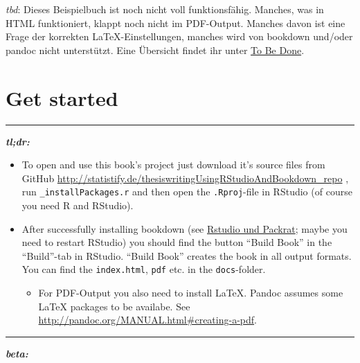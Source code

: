 \documentclass[]{book}
\providecommand{\tightlist}{%
  \setlength{\itemsep}{0pt}\setlength{\parskip}{0pt}}
\theoremstyle{definition}
\theoremstyle{definition}
\theoremstyle{remark}
\let\BeginKnitrBlock\begin \let\EndKnitrBlock\end
\begin{document}
\BeginKnitrBlock{rmdcaution}
\emph{tbd}: Dieses Beispielbuch ist noch nicht voll funktionsfähig.
Manches, was in HTML funktioniert, klappt noch nicht im PDF-Output.
Manches davon ist eine Frage der korrekten LaTeX-Einstellungen, manches
wird von bookdown und/oder pandoc nicht unterstützt. Eine Übersicht
findet ihr unter \protect\hyperlink{tbd}{To Be Done}.
\EndKnitrBlock{rmdcaution}

\section*{Get started}\label{get-started}

\begin{center}\rule{0.5\linewidth}{\linethickness}\end{center}

\textbf{\emph{tl;dr:}}

\begin{itemize}
\item
  To open and use this book's project just download it's source files
  from GitHub
  \url{http://statistify.de/thesiswritingUsingRStudioAndBookdown_repo} ,
  run \texttt{\_installPackages.r} and then open the
  \texttt{.Rproj}-file in RStudio (of course you need R and RStudio).
\item
  After successfully installing bookdown (see
  \protect\hyperlink{rstudio-und-packrat}{Rstudio und Packrat}; maybe
  you need to restart RStudio) you should find the button ``Build Book''
  in the ``Build''-tab in RStudio. ``Build Book'' creates the book in
  all output formats. You can find the \texttt{index.html}, \texttt{pdf}
  etc. in the \texttt{docs}-folder.

  \begin{itemize}
  \tightlist
  \item
    For PDF-Output you also need to install LaTeX. Pandoc assumes some
    LaTeX packages to be availabe. See
    \url{http://pandoc.org/MANUAL.html\#creating-a-pdf}.
  \end{itemize}
\end{itemize}

\begin{center}\rule{0.5\linewidth}{\linethickness}\end{center}

\textbf{\emph{beta:}}
\end{document}
